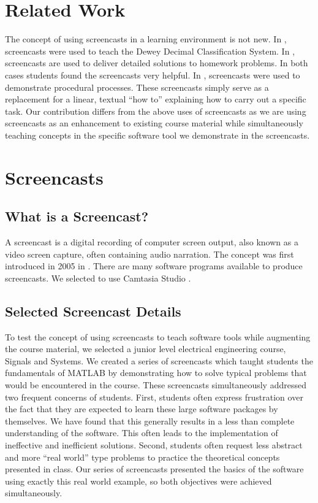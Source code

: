 \documentclass[a4paper,10pt]{article}
\begin{document}
\section{Related Work}
The concept of using screencasts in a learning environment is not new. In \cite{Library}, screencasts were used to teach the Dewey Decimal Classification System. In \cite{MaterialScience}, screencasts are used to deliver detailed solutions to homework problems. In both cases students found the screencasts very helpful. In \cite{ReferenceTool}, screencasts were used to demonstrate procedural processes. These screencasts simply serve as a replacement for a linear, textual ``how to'' explaining how to carry out a specific task. Our contribution differs from the above uses of screencasts as we are using screencasts as an enhancement to existing course material while simultaneously teaching concepts in the specific software tool we demonstrate in the screencasts.

\section{Screencasts}
\subsection{What is a Screencast?}
A screencast is a digital recording of computer screen output, also known as a video screen capture, often containing audio narration. The concept was first introduced in 2005 in \cite{Screencasts}. There are many software programs available to produce screencasts. We selected to use Camtasia Studio \cite{Camtasia}.

\subsection{Selected Screencast Details}
To test the concept of using screencasts to teach software tools while augmenting the course material, we selected a junior level electrical engineering course, Signals and Systems. We created a series of screencasts which taught students the fundamentals of MATLAB by demonstrating how to solve typical problems that would be encountered in the course. These screencasts simultaneously addressed two frequent concerns of students. First, students often express frustration over the fact that they are expected to learn these large software packages by themselves. We have found that this generally results in a less than complete understanding of the software. This often leads to the implementation of ineffective and inefficient solutions. Second, students often request less abstract and more ``real world'' type problems to practice the theoretical concepts presented in class. Our series of screencasts presented the basics of the software using exactly this real world example, so both objectives were achieved simultaneously.
\end{document}
